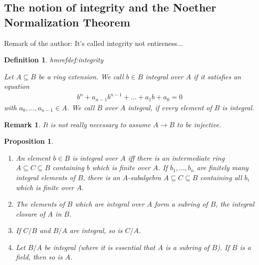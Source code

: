 \documentclass[DIV=14,parskip=full,pointednumbers]{scrartcl}
\newenvironment{rmnumerate}{\begin{enumerate}[label={\upshape(\roman*)}]}{\end{enumerate}}
\theoremstyle{cthm}
\newtheorem{prop}{Proposition}[subsection]
\theoremstyle{cdef}
\newtheorem{defi}{Definition}[subsection]
\newtheorem{rem}{Remark}[subsection]
\newcommand{\lbl}[1]{
	\label{#1}
	\edef\dummy{\curthm}
	\expandafter\xdef\csname thmref#1\endcsname{\dummy}
}
\newcommand{\ldotspam}{,\ldots,}
\begin{document}
\subsection{The notion of integrity and the Noether Normalization Theorem}
Remark of the author: It's called integrity not entireness...
\begin{defi}\lbl{def:integrity}
 Let $A\subseteq B$ be a ring extension. We call $b\in B$ \emph{integral} over $A$ if it satisfies an equation
 \begin{align*}
  b^n +a_{n-1}b^{n-1}+\ldots+a_1b+a_0 =0
 \end{align*}
 with $a_0,\ldots,a_{n-1}\in A$. We call $B$ over $A$ \emph{integral}, if every element of $B$ is integral.
\end{defi}
\begin{rem}
 It is not really necessary to assume $A\to B$ to be injective.
\end{rem}
\begin{prop}
 \begin{rmnumerate}
  \item An element $b\in B$ is integral over $A$ iff there is an intermediate ring $A\subseteq C\subseteq B$ containing $b$ which is finite over $A$. If $b_1\ldotspam b_n$ are finitely many integral elements of $B$, there is an $A$-subalgebra $A\subseteq C\subseteq B$ containing all $b_i$ which is finite over $A$.
  \item The elements of $B$ which are integral over $A$ form a subring of $B$, the \emph{integral closure} of $A$ in $B$.
  \item If $C/B$ and $B/A$ are integral, so is $C/A$.
  \item Let $B/A$ be integral (where it is essential that $A$ is a subring of $B$). If $B$ is a field, then so is $A$.
 \end{rmnumerate}

\end{prop}
\end{document}
